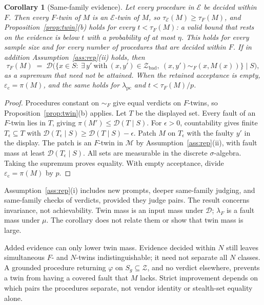 \documentclass[11pt]{article}
\newtheorem{corollary}{Corollary}
\theoremstyle{definition}
\theoremstyle{remark}
\newcommand{\simF}{\sim_F}
\newcommand{\lF}{\lambda_F}
\newcommand{\lpc}{\lambda_{\mathrm{pc}}}
\newcommand{\ecl}{\varepsilon_{\mathrm{c}}}
\newcommand{\D}{\mathcal{D}}
\newcommand{\Z}{\mathcal{Z}}
\newcommand{\Zbad}{\mathcal{Z}_{\mathrm{bad}}}
\newcommand{\Mclass}{\mathcal{M}}
\begin{document}
\begin{corollary}[Same-family evidence]\label{cor:samefamily}
Let every procedure in $\mathcal{E}$ be decided within $F$. Then every $F$-twin of $M$ is an
$\mathcal{E}$-twin of $M$, so $\tau_{\mathcal{E}}(M)\ge\tau_F(M)$, and
Proposition~\ref{prop:twin}(b) holds for every $t<\tau_F(M)$: a valid bound that rests on the
evidence is below $t$ with a probability of at most $\eta$. This holds for every sample size and for
every number of procedures that are decided within $F$. If in addition
Assumption~\ref{ass:rep}(ii) holds, then
\[
\tau_F(M)\;=\;\D\bigl(\{x\in S:\ \exists\,y'\ \text{with}\ (x,y')\in\Zbad,\ (x,y')\simF(x,M(x))\}\;\big|\;S\bigr),
\]
as a supremum that need not be attained. When the retained acceptance is empty, $\ecl=\pi(M)$, and
the same holds for $\lpc$ and $t<\tau_F(M)/p$.
\end{corollary}
\begin{proof}
Procedures constant on $\simF$ give equal verdicts on $F$-twins, so
Proposition~\ref{prop:twin}(b) applies.
Let $T$ be the displayed set. Every fault of an $F$-twin lies in $T$, giving
$\pi(M')\le\D(T\mid S)$.
For $\epsilon>0$, countability gives finite $T_\epsilon\subseteq T$ with
$\D(T_\epsilon\mid S)\ge\D(T\mid S)-\epsilon$.
Patch $M$ on $T_\epsilon$ with the faulty $y'$ in the display.
The patch is an $F$-twin in $\Mclass$ by Assumption~\ref{ass:rep}(ii), with fault mass at least
$\D(T_\epsilon\mid S)$. All sets are measurable in the discrete $\sigma$-algebra.
Taking the supremum proves equality. With empty acceptance, divide $\ecl=\pi(M)$ by $p$.
\end{proof}

Assumption~\ref{ass:rep}(i) includes new prompts, deeper same-family judging, and same-family
checks of verdicts, provided they judge pairs.
The result concerns invariance, not achievability.
Twin mass is an input mass under $\D$; $\lF$ is a fault mass under $\mu$.
The corollary does not relate them or show that twin mass is large.

Added evidence can only lower twin mass. Evidence decided within $N$ still leaves simultaneous
$F$- and $N$-twins indistinguishable; it need not separate all $N$ classes.
A grounded procedure returning $\varphi$ on $S_g\subseteq\Z$, and no verdict elsewhere,
prevents a twin from having a covered fault that $M$ lacks.
Strict improvement depends on which pairs the procedures separate, not vendor identity or
stealth-set equality alone.
\end{document}
